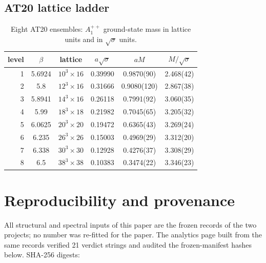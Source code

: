 \documentclass[11pt,a4paper]{article}
\theoremstyle{definition}
\theoremstyle{remark}
\newcommand{\sqs}{\sqrt{\sigma}}
\begin{document}
\subsection{AT20 lattice ladder}
\begin{table}[ht]\centering\small\caption{Eight AT20 ensembles: $A_1^{++}$ ground-state mass in lattice units and in $\sqs$ units.}\label{tab:ladder}
\begin{tabular}{@{}rccccc@{}}\toprule level & $\beta$ & lattice & $a\sqs$ & $aM$ & $M/\sqs$\\\midrule
1 & 5.6924 & $10^3\times 16$ & 0.39990 & 0.9870(90) & 2.468(42)\\
2 & 5.8 & $12^3\times 16$ & 0.31666 & 0.9080(120) & 2.867(38)\\
3 & 5.8941 & $14^3\times 16$ & 0.26118 & 0.7991(92) & 3.060(35)\\
4 & 5.99 & $18^3\times 18$ & 0.21982 & 0.7045(65) & 3.205(32)\\
5 & 6.0625 & $20^3\times 20$ & 0.19472 & 0.6365(43) & 3.269(24)\\
6 & 6.235 & $26^3\times 26$ & 0.15003 & 0.4969(29) & 3.312(20)\\
7 & 6.338 & $30^3\times 30$ & 0.12928 & 0.4276(37) & 3.308(29)\\
8 & 6.5 & $38^3\times 38$ & 0.10383 & 0.3474(22) & 3.346(23)\\
\bottomrule\end{tabular}\end{table}


\section{Reproducibility and provenance}\label{app:repro}
\noindent All structural and spectral inputs of this paper are the frozen records of the two projects; no number was re-fitted for the paper. The analytics page built from the same records verified 21 verdict strings and audited the frozen-manifest hashes below. SHA-256 digests:
\end{document}
